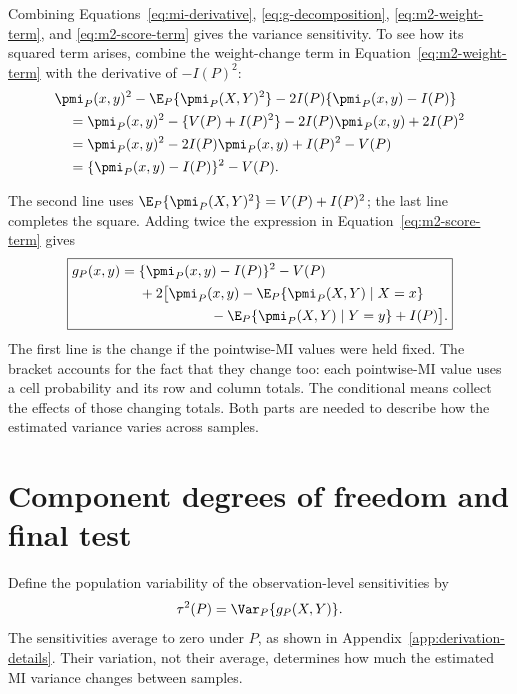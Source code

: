Combining Equations~\eqref{eq:mi-derivative},
\eqref{eq:g-decomposition}, \eqref{eq:m2-weight-term}, and
\eqref{eq:m2-score-term} gives the variance sensitivity. To see how its
squared term arises, combine the weight-change term in
Equation~\eqref{eq:m2-weight-term} with the derivative of \(-I(P)^2\):
\begin{align*}
 &\pmi_P(x,y)^2-\E_P\{\pmi_P(X,Y)^2\}
       -2I(P)\{\pmi_P(x,y)-I(P)\}\\*
 &\quad=\pmi_P(x,y)^2-\{V(P)+I(P)^2\}
       -2I(P)\pmi_P(x,y)+2I(P)^2\\*
 &\quad=\pmi_P(x,y)^2-2I(P)\pmi_P(x,y)+I(P)^2-V(P)\\*
 &\quad=\{\pmi_P(x,y)-I(P)\}^2-V(P).
\end{align*}
\begin{samepage}
The second line uses
\(\E_P\{\pmi_P(X,Y)^2\}=V(P)+I(P)^2\); the last line completes the
square. Adding twice the expression in Equation~\eqref{eq:m2-score-term}
gives
\begin{equation}
\boxed{
\begin{aligned}
g_P(x,y)
={}&\{\pmi_P(x,y)-I(P)\}^2-V(P)\\
&+2\bigl[
\pmi_P(x,y)
-\E_P\{\pmi_P(X,Y)\mid X=x\}\\
&\hspace{18mm}
-\E_P\{\pmi_P(X,Y)\mid Y=y\}
+I(P)
\bigr].
\end{aligned}
}
\label{eq:g-final}
\end{equation}
The first line is the change if the pointwise-MI values were held fixed. The
bracket accounts for the fact that they change too: each pointwise-MI value
uses a cell probability and its row and column totals. The conditional means
collect the effects of those changing totals. Both parts are needed to
describe how the estimated variance varies across samples.
\par
\end{samepage}

\section{Component degrees of freedom and final test}


Define the population variability of the observation-level sensitivities by
\begin{equation}
  \tau^2(P)=\Var_P\{g_P(X,Y)\}.
  \label{eq:tau-definition}
\end{equation}
The sensitivities average to zero under \(P\), as shown in
Appendix~\ref{app:derivation-details}. Their variation, not their average,
determines how much the estimated MI variance changes between samples.

